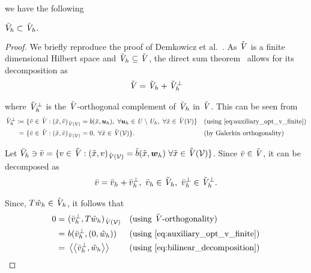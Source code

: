 we have the following

\begin{proposition} \label{prop:pg_subset_of_dpg}
$\bar{V}_h \subset \tilde{\mathit{{{V}}}}_h.$
\end{proposition}

\begin{proof}

We briefly reproduce the proof of Demkowicz et al.~\cite[Section ]{Demkowicz2014_overview}. As
$\tilde{\mathit{{{V}}}}$ is a finite dimensional Hilbert space and $\tilde{\mathit{{{V}}}}_h \subseteq \tilde{\mathit{{{V}}}}$, the direct sum
theorem~\cite[Theorem ]{Ciarlet2013} allows for its decomposition as
\begin{align}
\tilde{\mathit{{{V}}}} = \tilde{\mathit{{{V}}}}_h + \tilde{\mathit{{{V}}}}_h^{\bot}
\end{align}

where $\tilde{\mathit{{{V}}}}_h^{\bot}$ is the $\tilde{\mathit{{{V}}}}$-orthogonal complement of $\tilde{\mathit{{{V}}}}_h$ in $\tilde{\mathit{{{V}}}}$. This can be
seen from 
\begin{align}
\afspace{V}_h^{\bot}
\coloneqq\ & \{ \tilde{v} \in \afspace{V} :
(\tilde{x},\tilde{v})_{\afspace{V}(\fe{V})} = b(\tilde{x},\varg{u}_h),\ \forall \varg{u}_h \in \fspace{U} \setminus
\fspace{U}_h,\ \forall \tilde{x} \in \afspace{V}(\fe{V}) \}
 && (\text{using}~\eqref{eq:auxiliary_opt_v_finite}) \nonumber \\
=\ & \{ \tilde{v} \in \afspace{V} :
(\tilde{x},\tilde{v})_{\afspace{V}(\fe{V})} = 0,\ \forall \tilde{x} \in \afspace{V}(\fe{V}) \}.
 && (\text{by Galerkin orthogonality}) \nonumber
\end{align}


Let $\bar{V}_h \ni \bar{v} = \{ v \in \tilde{\mathit{{{V}}}} : (\tilde{x},v)_{\tilde{\mathit{{{V}}}}(\mathcal{{{V}}})} = \bar{b}(\tilde{x},\mathit{\bm{{w}}}_h)\ \forall
\tilde{x} \in \tilde{\mathit{{{V}}}}(\mathcal{{{V}}}) \}$. Since $\bar{v} \in \tilde{\mathit{{{V}}}}$, it can be decomposed as
\begin{align}
\bar{v} = \bar{v}_h + \bar{v}_h^{\bot},\ \bar{v}_h \in \afspace{V}_h,\ \bar{v}_h^{\bot} \in \afspace{V}_h^{\bot}.
\end{align}

Since, $T\hat{w}_h \in \tilde{\mathit{{{V}}}}_h$, it follows that
\begin{align}
0 
=\ & (\bar{v}_h^{\bot},T\hat{w}_h)_{\tilde{\mathit{{{V}}}}(\mathcal{{{V}}})} && (\text{using}\ \tilde{\mathit{{{V}}}}\text{-orthogonality}) \nonumber \\
=\ & b(\bar{v}_h^{\bot},(0,\hat{w}_h)) && (\text{using}~\eqref{eq:auxiliary_opt_v_finite}) \nonumber \\
=\ & \left<\left< \bar{v}_h^{\bot},\hat{w}_h \right>\right> && (\text{using}~\eqref{eq:bilinear_decomposition}) \label{eq:weak_continuous_v}
\end{align}


\end{proof}
